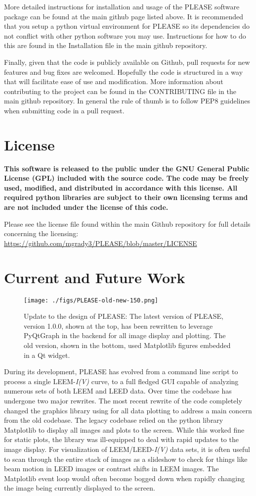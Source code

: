 More detailed instructions for installation and usage of the PLEASE software package can be found at the main github page listed above. It is recommended that you setup a python virtual environment for PLEASE so its dependencies do not conflict with other python software you may use. Instructions for how to do this are found in the Installation file in the main github repository.

Finally, given that the code is publicly available on Github, pull requests for new features and bug fixes are welcomed. Hopefully the code is structured in a way that will facilitate ease of use and modification. More information about contributing to the project can be found in the CONTRIBUTING file in the main github repository. In general the rule of thumb is to follow PEP8 guidelines when submitting code in a pull request.

\section{License}
\textbf{This software is released to the public under the GNU General Public License (GPL) included with the source code. The code may be freely used, modified, and distributed in accordance with this license. All required python libraries are subject to their own licensing terms and are not included under the license of this code.}

Please see the license file found within the main Github repository for full details concerning the licensing: \url{https://github.com/mgrady3/PLEASE/blob/master/LICENSE}

\section{Current and Future Work}
\begin{figure}
    \centering
    \texttt{[image: ./figs/PLEASE-old-new-150.png]}
    \caption{Update to the design of PLEASE: The latest version of PLEASE, version 1.0.0, shown at the top, has been rewritten to leverage PyQtGraph in the backend for all image display and plotting. The old version, shown in the bottom, used Matplotlib figures embedded in a Qt widget.}
    \label{fig:PLEASE-Update}
\end{figure}
During its development, PLEASE has evolved from a command line script to process a single LEEM-\textit{I(V)} curve, to a full fledged GUI capable of analyzing numerous sets of both LEEM and LEED data. Over time the codebase has undergone two major rewrites. The most recent rewrite of the code completely changed the graphics library using for all data plotting to address a main concern from the old codebase. The legacy codebase relied on the python library Matplotlib to display all images and plots to the screen. While this worked fine for static plots, the library was ill-equipped to deal with rapid updates to the image display. For visualization of LEEM/LEED-\textit{I(V)} data sets, it is often useful to scan through the entire stack of images as a slideshow to check for things like beam motion in LEED images or contrast shifts in LEEM images. The Matplotlib event loop would often become bogged down when rapidly changing the image being currently displayed to the screen.


